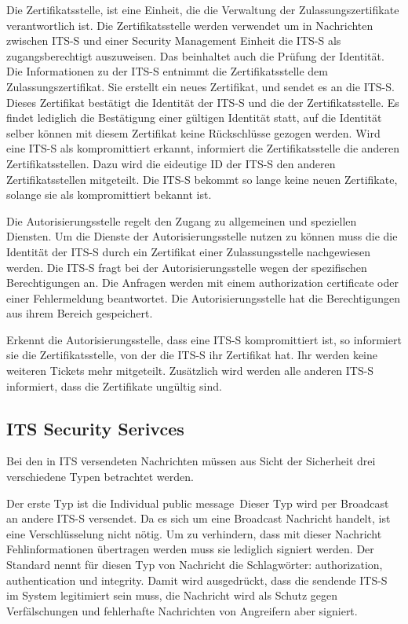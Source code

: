 Die Zertifikatsstelle, ist eine Einheit, die die Verwaltung der Zulassungszertifikate verantwortlich ist. Die Zertifikatsstelle werden verwendet um in Nachrichten zwischen \ac{ITS-S} und einer Security Management Einheit die \ac{ITS-S} als zugangsberechtigt auszuweisen. Das beinhaltet auch die Prüfung der Identität. Die Informationen zu der \ac{ITS-S} entnimmt die Zertifikatsstelle dem Zulassungszertifikat. Sie erstellt ein neues Zertifikat, und sendet es an die \ac{ITS-S}. Dieses Zertifikat bestätigt die Identität der \ac{ITS-S} und die der Zertifikatsstelle. Es findet lediglich die Bestätigung einer gültigen Identität statt,  auf die Identität selber können mit diesem Zertifikat keine Rückschlüsse gezogen werden. Wird eine \ac{ITS-S} als kompromittiert erkannt, informiert die Zertifikatsstelle die anderen Zertifikatsstellen. Dazu wird die eideutige \ac{ID} der \ac{ITS-S} den anderen Zertifikatsstellen mitgeteilt. Die \ac{ITS-S} bekommt so lange keine neuen Zertifikate, solange sie als kompromittiert bekannt ist.  

Die Autorisierungsstelle regelt den Zugang zu allgemeinen und speziellen Diensten. Um die Dienste der Autorisierungsstelle nutzen zu können muss die die Identität der \ac{ITS-S} durch ein Zertifikat einer Zulassungsstelle nachgewiesen werden. Die \ac{ITS-S} fragt bei der Autorisierungsstelle wegen der spezifischen Berechtigungen an. Die Anfragen werden mit einem authorization certificate oder einer Fehlermeldung beantwortet. Die Autorisierungsstelle hat die Berechtigungen aus ihrem Bereich gespeichert.

Erkennt die Autorisierungsstelle, dass eine \ac{ITS-S} kompromittiert ist, so informiert sie die Zertifikatsstelle, von der die \ac{ITS-S} ihr Zertifikat hat. Ihr werden keine weiteren Tickets mehr mitgeteilt. Zusätzlich wird werden alle anderen \ac{ITS-S} informiert, dass die Zertifikate ungültig sind.  



\subsection{ITS Security Serivces}
Bei den in \ac{ITS} versendeten Nachrichten müssen aus Sicht der Sicherheit drei verschiedene Typen betrachtet werden. 

Der erste Typ ist die \glqq Individual public message\grqq~Dieser Typ wird per Broadcast an andere \ac{ITS-S} versendet. Da es sich um eine Broadcast Nachricht handelt, ist eine Verschlüsselung nicht nötig. Um zu verhindern, dass mit dieser Nachricht Fehlinformationen übertragen werden muss sie lediglich signiert werden. Der Standard \cite{ts102731} nennt für diesen Typ von Nachricht die Schlagwörter: authorization, authentication und integrity. Damit wird ausgedrückt, dass die sendende \ac{ITS-S} im System legitimiert sein muss, die Nachricht wird als Schutz gegen Verfälschungen und fehlerhafte Nachrichten von Angreifern aber signiert.

